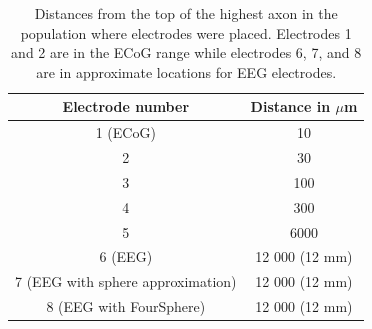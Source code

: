 \documentclass[final, a4paper,masters,en,listoffigures,listoftables,norwegiandates]{NMBU}
\begin{document}
\begin{table}[h]
    \centering
    \begin{tabular}{|c|c|}
        \hline
         Electrode number & Distance in $\mu$m  \\
         \hline
         1 (ECoG) & 10  \\
         \hline
         2 & 30 \\
         \hline
         3 & 100    \\
         \hline
         4 & 300 \\
         \hline
         5 & 6000 \\
         \hline
         6 (EEG) & 12 000 (12 mm) \\
         \hline
         7 (EEG with sphere approximation) & 12 000 (12 mm)\\
         \hline
         8 (EEG with FourSphere) & 12 000 (12 mm) \\
         \hline
    \end{tabular}
    \caption{Distances from the top of the highest axon in the population where electrodes were placed. Electrodes 1 and 2 are in the ECoG range while electrodes 6, 7, and 8 are in approximate locations for EEG electrodes.}
    \label{tab:elecdist}
\end{table}
\end{document}
